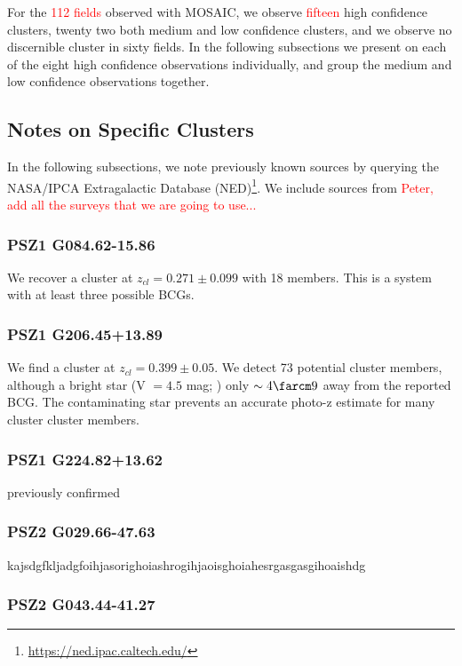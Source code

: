 \documentclass[apj, revtex4-1]{emulateapj}
\newcommand{\editorial}[1]{\textcolor{red}{#1}}
\begin{document}
For the \editorial{112 fields} observed with MOSAIC, we observe \editorial{fifteen} high confidence clusters, twenty two both medium and low confidence clusters, and we observe no discernible cluster in sixty fields. In the following subsections we present on each of the eight high confidence observations individually, and group the medium and low confidence observations together.

\subsection{Notes on Specific Clusters}

In the following subsections, we note previously known sources by querying the NASA/IPCA Extragalactic Database (NED)\footnote{\url{https://ned.ipac.caltech.edu/}}. We include sources from \editorial{Peter, add all the surveys that we are going to use...}

\subsubsection{PSZ1 G084.62-15.86}
We recover a cluster at $z_{cl} = 0.271 \pm 0.099$ with 18 members. This is a system with at least three possible BCGs.

\subsubsection{PSZ1 G206.45+13.89}
We find a cluster at $z_{cl} = 0.399 \pm 0.05$. We detect 73 potential cluster members, although a bright star (V $= 4.5$ mag; \citealt{Hog2000}) only $\sim4\farcm9$ away from the reported BCG. The contaminating star prevents an accurate photo-z estimate for many cluster cluster members.

\subsubsection{PSZ1 G224.82+13.62}
previously confirmed

\subsubsection{PSZ2 G029.66-47.63}

kajsdgfkljadgfoihjasorighoiashrogihjaoisghoiahesrgasgasgihoaishdg


\subsubsection{PSZ2 G043.44-41.27}
\end{document}
